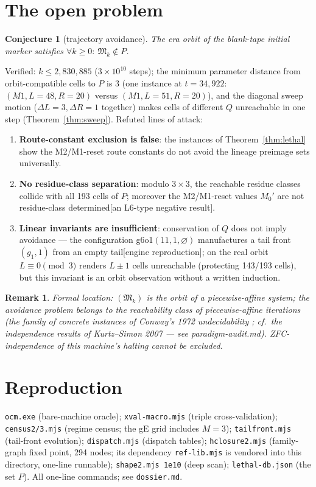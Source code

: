 \documentclass[11pt]{amsart}
\newtheorem{remark}[theorem]{Remark}
\newtheorem{conjecture}[theorem]{Conjecture}
\begin{document}
\section{The open problem}\label{sec:open}

\begin{conjecture}[trajectory avoidance]\label{conj:avoid}
The era orbit of the blank-tape initial marker satisfies $\forall k\ge0:\ \mathfrak M_k\notin P$.
\end{conjecture}

Verified: $k\le2{,}830{,}885$ ($3\times10^{10}$ steps); the minimum parameter distance from orbit-compatible cells to $P$ is $3$ (one instance at $t=34{,}922$: $(M1,L{=}48,R{=}20)$ versus $(M1,L{=}51,R{=}20)$), and the diagonal sweep motion ($\Delta L=3,\Delta R=1$ together) makes cells of different $Q$ unreachable in one step (Theorem~\ref{thm:sweep}). Refuted lines of attack:

\begin{enumerate}
\item \textbf{Route-constant exclusion is false}: the instances of Theorem~\ref{thm:lethal} show the M2/M1-reset route constants do not avoid the lineage preimage sets universally.
\item \textbf{No residue-class separation}: modulo $3\times3$, the reachable residue classes collide with all 193 cells of $P$; moreover the M2/M1-reset values $M_0'$ are not residue-class determined[an L6-type negative result].
\item \textbf{Linear invariants are insufficient}: conservation of $Q$ does not imply avoidance --- the configuration g6o1$(11,1,\varnothing)$ manufactures a tail front $(g_1,1)$ from an empty tail[engine reproduction]; on the real orbit $L\equiv0\pmod3$ renders $L\pm1$ cells unreachable (protecting 143/193 cells), but this invariant is an orbit observation without a written induction.
\end{enumerate}

\begin{remark}
Formal location: $(\mathfrak M_k)$ is the orbit of a piecewise-affine system; the avoidance problem belongs to the reachability class of piecewise-affine iterations (the family of concrete instances of Conway's 1972 undecidability \cite{conway72}; cf.\ the independence results of Kurtz--Simon 2007 \cite{kurtzsimon07} --- see paradigm-audit.md). ZFC-independence of this machine's halting cannot be excluded.
\end{remark}

\section*{Reproduction}
\texttt{ocm.exe} (bare-machine oracle); \texttt{xval-macro.mjs} (triple cross-validation); \texttt{census2/3.mjs} (regime census; the gE grid includes $M{=}3$); \texttt{tailfront.mjs} (tail-front evolution); \texttt{dispatch.mjs} (dispatch tables); \texttt{hclosure2.mjs} (family-graph fixed point, 294 nodes; its dependency \texttt{ref-lib.mjs} is vendored into this directory, one-line runnable); \texttt{shape2.mjs 1e10} (deep scan); \texttt{lethal-db.json} (the set $P$). All one-line commands; see \texttt{dossier.md}.
\end{document}
